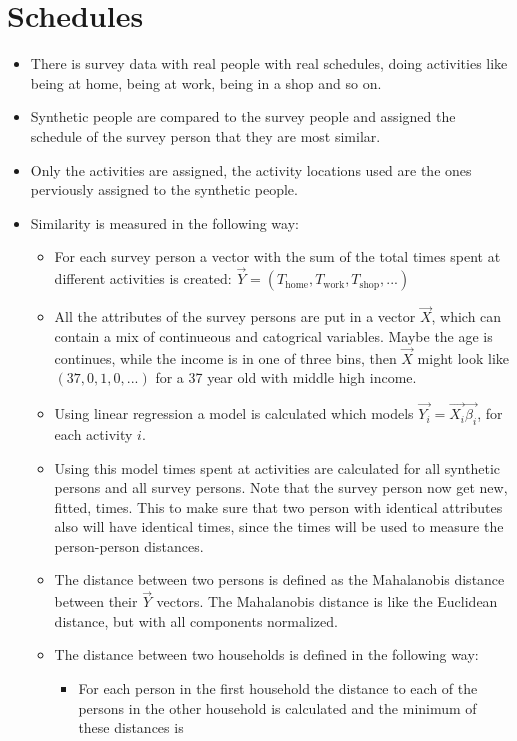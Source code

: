 \documentclass[12pt]{article}
\begin{document}
\section{Schedules}
\begin{itemize}
\item
There is survey data with real people with real schedules, doing activities like being
at home, being at work, being in a shop and so on.
\item
Synthetic people are compared to the survey people and assigned the schedule of
the survey person that they are most similar.
\item
Only the activities are assigned, the activity locations used are the ones
perviously assigned to the synthetic people.
\item
Similarity is measured in the following way:
\begin{itemize}
\item
For each survey person a vector with the sum of the total times spent at different
activities is created: $\vec{Y} = (T_{\textrm{home}}, T_{\textrm{work}},
T_{\textrm{shop}}, ...)$
\item 
All the attributes of the survey persons are put in a vector $\vec{X}$, which
can contain a mix of continueous and catogrical variables. Maybe the age is
continues, while the income is in one of three bins, then $\vec{X}$ might look
like $(37, 0, 1, 0, ...)$ for a 37 year old with middle high income.
\item
Using linear regression a model is calculated which models $\vec{Y_i} =
\vec{X_i}\vec{\beta_i}$, for each activity $i$.
\item
Using this model times spent at activities are calculated for all synthetic
persons and all survey persons. Note that the survey person now get new, fitted,
times. This to make sure that two person with identical attributes also will
have identical times, since the times will be used to measure the person-person
distances.
\item
The distance between two persons is defined as the Mahalanobis distance between
their $\vec{Y}$ vectors. The Mahalanobis distance is like the Euclidean
distance, but with all components normalized.
\item
The distance between two households is defined in the following way:
\begin{itemize}
\item
For each person in the first household the distance to each of the persons in
the other household is calculated and the minimum of these distances is

\end{itemize}
\end{itemize}
\end{itemize}
\end{document}
